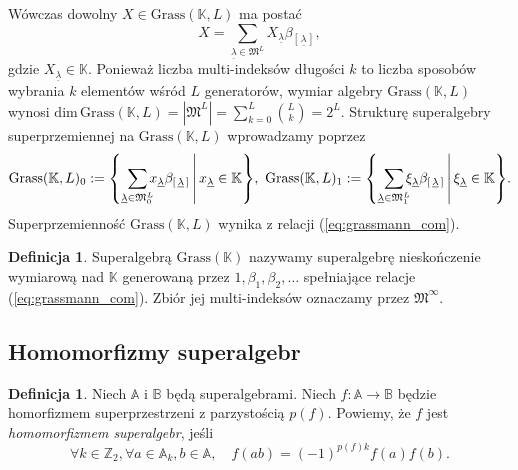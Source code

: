 \documentclass[11pt,a4paper]{report}
\theoremstyle{definition}
\newtheorem{definition}[theorem]{Definicja}
\begin{document}
Wówczas dowolny $X \in \mathrm{Grass}(\mathbb{K},L)$ ma postać
\begin{equation*}
	X = \!\! \sum_{\underline{\lambda} \in \mathfrak{M}^L} \!\!X_{\underline{\lambda}} \beta_{\left[\, \underline{\lambda}\, \right]},
\end{equation*}
gdzie $X_{\underline{\lambda}} \in \mathbb{K}$. Ponieważ liczba multi-indeksów długości $k$ to liczba sposobów wybrania $k$ elementów wśród $L$ generatorów, wymiar algebry $\mathrm{Grass}(\mathbb{K},L)$ wynosi $\textrm{dim}\,\mathrm{Grass}(\mathbb{K},L)=|\mathfrak{M}^{L}| = \sum_{k=0}^{L} \binom{L}{k} = 2^L.$ Strukturę superalgebry superprzemiennej na $\mathrm{Grass}(\mathbb{K},L)$ wprowadzamy poprzez
\begin{equation*}
	\mathrm{Grass}(\mathbb{K},L)_0 := \mleft\{ \sum_{\underline{\lambda} \in \mathfrak{M}^L_{0}} \!\!\! x_{\underline{\lambda}} \beta_{\left[\, \underline{\lambda}\, \right]} \,\middle|\, x_{\underline{\lambda}} \in \mathbb{K} \mright\},
	\ \mathrm{Grass}(\mathbb{K},L)_1 := \mleft\{ \sum_{\underline{\lambda} \in \mathfrak{M}^L_{1}} \!\!\! \xi_{\underline{\lambda}} \beta_{\left[\, \underline{\lambda}\, \right]} \,\middle|\, \xi_{\underline{\lambda}} \in \mathbb{K} \mright\}.
\end{equation*}
Superprzemienność $\mathrm{Grass}(\mathbb{K},L)$ wynika z relacji (\ref{eq:grassmann_com}).

\begin{definition}
	Superalgebrą $\mathrm{Grass}(\mathbb{K})$ nazywamy superalgebrę nieskończenie wymiarową nad $\mathbb{K}$ generowaną przez $1, \beta_1, \beta_2, \ldots$ spełniające relacje (\ref{eq:grassmann_com}). Zbiór jej multi-indeksów oznaczamy przez $\mathfrak{M}^\infty$.
\end{definition}

\subsection{Homomorfizmy superalgebr}

\begin{definition}
	\label{superalgebra_homomorphism}
	Niech $\mathbb{A}$ i $\mathbb{B}$ będą superalgebrami. Niech $f: \mathbb{A} \rightarrow \mathbb{B}$ będzie homorfizmem superprzestrzeni z parzystością $p(f)$. Powiemy, że $f$ jest \textit{homomorfizmem superalgebr}, jeśli
	\begin{equation*}
		\forall k \in \mathbb{Z}_2, \forall a \in \mathbb{A}_k, b \in \mathbb{A}, \quad f(ab) = (-1)^{p(f)k}f(a)f(b).
	\end{equation*}
\end{definition}
\end{document}

